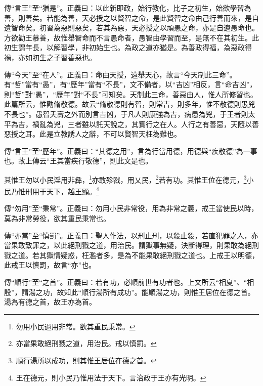 {\noindent\zhuan{}\fzbyks 傳“言王”至“猶是”。正義曰：以此新即政，始行教化，比子之初生，始欲學習為善，則善矣。若能為善，天必授之以賢智之命，是此賢智之命由己行善而來，是自遺智命矣。初習為惡則惡矣，若其為惡，天必授之以頑愚之命，亦是自遺愚命也。方欲勸王慕善，故惟舉智命而不言愚命者，愚智由學習而至，是無不在其初生。此初生謂年長，以解習學，非初始生也。為政之道亦猶是。為善政得福，為惡政得禍，亦如初生之子習善惡也。 \par}

{\noindent\zhuan{}\fzbyks 傳“今天”至“在人”。正義曰：命由天授，遠舉天心，故言“今天制此三命”。有“哲”當有“愚”，有“歷年”當有“不長”，文不備者，以“吉凶”相反，言“命吉凶”，則“哲”對“愚”，“歷年”對“不長”可知矣。天制此三命，善惡由人，惟人所修習也。此篇所云，惟勸脩敬德。故云“脩敬德則有智，則常吉，則多年，惟不敬德則愚兇不長也”。愚智夭壽之外而別言吉凶，于凡人則康強為吉，病患為兇，于王者則太平為吉，禍亂為兇，三者雖以託天說之，其實行之在人。人行之有善惡，天隨以善惡授之耳。此是立教誘人之辭，不可以賢智天枉為難也。 \par}

{\noindent\zhuan{}\fzbyks 傳“言王”至“歷年”。正義曰：“其德之用”，言為行當用德，用德與“疾敬德”為一事也。故上傳云“王其當疾行敬德”，則此文是也。 \par}

其惟王勿以小民淫用非彝，\footnote{勿用小民過用非常。欲其重民秉常。}亦敢殄戮，用乂民，\footnote{亦當果敢絕刑戮之道，用治民。戒以慎罰。}若有功。其惟王位在德元，\footnote{順行湯所以成功，則其惟王居位在德之首。}小民乃惟刑用于天下，越王顯。\footnote{王在德元，則小民乃惟用法于天下。言治政于王亦有光明。}

{\noindent\zhuan{}\fzbyks 傳“勿用”至“秉常”。正義曰：勿用小民非常役，用為非常之義，戒王當使民以時，莫為非常勞役，欲其重民秉常也。 \par}

{\noindent\zhuan{}\fzbyks 傳“亦當”至“慎罰”。正義曰：聖人作法，以刑止刑，以殺止殺，若直犯罪之人，亦當果敢致罪之，以此絕刑戮之道，用治民。謂獄事無疑，決斷得理，則果敢為絕刑戮之道。若其獄情疑惑，枉濫者多，是為不能果敢絕刑戮之道也。上戒王以明德，此戒王以慎罰，故言“亦”也。 \par}

{\noindent\zhuan{}\fzbyks 傳“順行”至“之首”。正義曰：若有功，必順前世有功者也。上文所云“相夏”、“相殷”，謂湯之功，故知此“順行湯所有成功”。能順湯之功，則惟王居位在德之首。湯為有德之首，故王亦為首。 \par}

